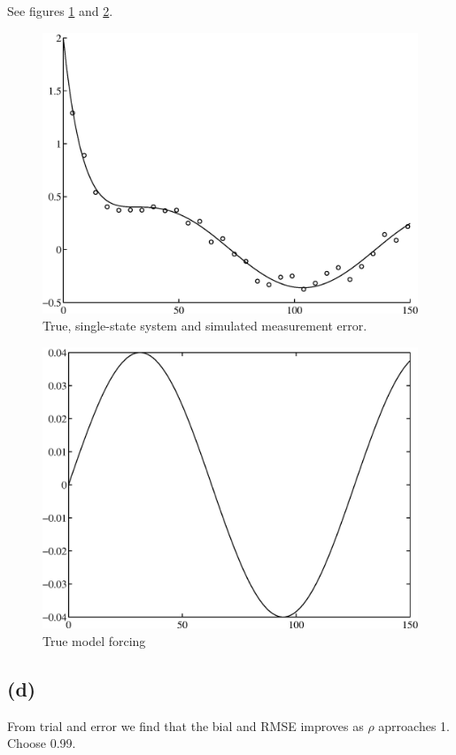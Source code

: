 \documentclass[fleqn, letterpaper]{tufte-handout}
\begin{document}
See figures \ref{2ca} and \ref{2cb}.
\begin{figure}
        \includegraphics[width=\textwidth]{2ca}
        \caption{True, single-state system and simulated measurement error.}
        \label{2ca}
\end{figure}
\begin{figure}
        \includegraphics[width=\textwidth]{2cb}
        \caption{True model forcing}
        \label{2cb}
\end{figure}

\subsection{(d)}
From trial and error we find that the bial and RMSE improves as $\rho$ aprroaches 1. Choose 0.99.
\end{document}
